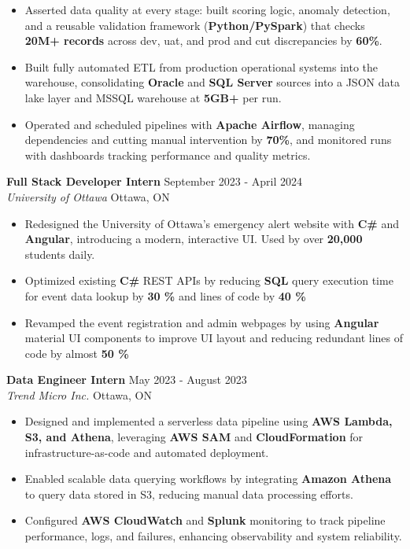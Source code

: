 \documentclass[a4paper]{article}
\begin{document}
\begin{itemize}
\item Asserted data quality at every stage: built scoring logic, anomaly detection, and a reusable validation framework (\textbf{Python/PySpark}) that checks \textbf{20M+ records} across dev, uat, and prod and cut discrepancies by \textbf{60\%}.

\item Built fully automated ETL from production operational systems into the warehouse, consolidating \textbf{Oracle} and \textbf{SQL Server} sources into a JSON data lake layer and MSSQL warehouse at \textbf{5GB+} per run.

\item Operated and scheduled pipelines with \textbf{Apache Airflow}, managing dependencies and cutting manual intervention by \textbf{70\%}, and monitored runs with dashboards tracking performance and quality metrics.

\end{itemize}

\textbf{Full Stack Developer Intern } \hfill September 2023 - April 2024\\
\textit{University of Ottawa} \hfill Ottawa, ON\\
\vspace{-2mm}
\begin{itemize} \itemsep -4pt \topsep 0pt
    \item Redesigned the University of Ottawa's emergency alert website with \textbf{C\#} and \textbf{Angular}, introducing a modern, interactive UI. Used by over \textbf{20,000} students daily.
     \item Optimized existing \textbf{C\#} REST APIs by reducing \textbf{SQL} query execution time for event data lookup by \textbf{30 \%} and lines of code by \textbf{40 \%}
    \item Revamped the event registration and admin webpages by using \textbf{Angular} material UI components to improve UI layout and reducing redundant lines of code by almost \textbf{50 \%}
\end{itemize}

\textbf{Data Engineer Intern} \hfill May 2023 - August 2023\\
\textit{Trend Micro Inc.} \hfill Ottawa, ON\\
\vspace{-2mm}
\begin{itemize} \itemsep -4pt \topsep 0pt

\item Designed and implemented a serverless data pipeline using \textbf{AWS Lambda, S3, and Athena}, leveraging \textbf{AWS SAM} and \textbf{CloudFormation} for infrastructure-as-code and automated deployment.

\item Enabled scalable data querying workflows by integrating \textbf{Amazon Athena} to query data stored in S3, reducing manual data processing efforts.

\item Configured \textbf{AWS CloudWatch} and \textbf{Splunk} monitoring to track pipeline performance, logs, and failures, enhancing observability and system reliability.

\end{itemize}
\end{document}
